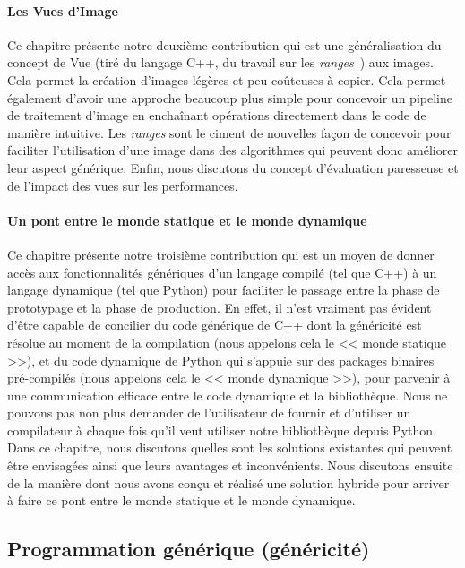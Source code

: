 \paragraph{Les Vues d'Image} Ce chapitre présente notre deuxième contribution qui est une généralisation du concept de
Vue (tiré du langage C++, du travail sur les \emph{ranges}~\parencite{niebler.2018.ranges}) aux images. Cela permet la
création d'images légères et peu coûteuses à copier. Cela permet également d'avoir une approche beaucoup plus simple
pour concevoir un pipeline de traitement d'image en enchaînant opérations directement dans le code de manière intuitive.
Les \emph{ranges} sont le ciment de nouvelles façon de concevoir pour faciliter l'utilisation d'une image dans des
algorithmes qui peuvent donc améliorer leur aspect générique. Enfin, nous discutons du concept d'évaluation paresseuse
et de l'impact des vues sur les performances.

\paragraph{Un pont entre le monde statique et le monde dynamique} Ce chapitre présente notre troisième contribution qui
est un moyen de donner accès aux fonctionnalités génériques d'un langage compilé (tel que C++) à un langage dynamique
(tel que Python) pour faciliter le passage entre la phase de prototypage et la phase de production. En effet, il n'est
vraiment pas évident d'être capable de concilier du code générique de C++ dont la généricité est résolue au moment de la
compilation (nous appelons cela le << monde statique >>), et du code dynamique de Python qui s'appuie sur des packages
binaires pré-compilés (nous appelons cela le << monde dynamique >>), pour parvenir à une communication efficace entre le
code dynamique et la bibliothèque. Nous ne pouvons pas non plus demander de l'utilisateur de fournir et d'utiliser un
compilateur à chaque fois qu'il veut utiliser notre bibliothèque depuis Python. Dans ce chapitre, nous discutons quelles
sont les solutions existantes qui peuvent être envisagées ainsi que leurs avantages et inconvénients. Nous discutons
ensuite de la manière dont nous avons conçu et réalisé une solution hybride pour arriver à faire ce pont entre le monde
statique et le monde dynamique.


\subsection*{Programmation générique (généricité)}


